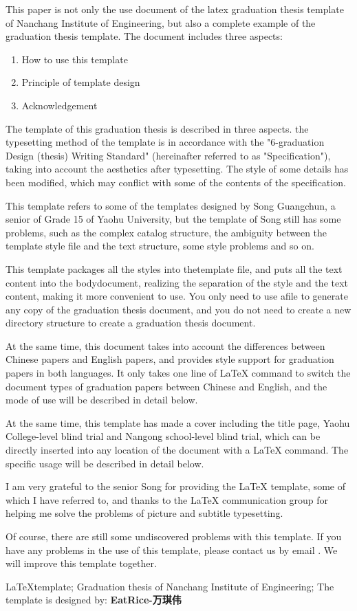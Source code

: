 \begin{Abstract}

    This paper is not only the use document of the latex graduation thesis template of Nanchang Institute of Engineering, but also a complete example of the graduation thesis template. 
    The document includes three aspects:

    \begin{enumerate}
        \item How to use this template
        \item Principle of template design
        \item Acknowledgement
    \end{enumerate}

    The template of this graduation thesis is described in three aspects. the typesetting method of the template is in accordance with the "6-graduation Design (thesis) Writing Standard" (hereinafter referred to as "Specification"), taking into account the aesthetics after typesetting. The style of some details has been modified, which may conflict with some of the contents of the specification.

    This template refers to some of the templates designed by Song Guangchun, a senior of Grade 15 of Yaohu University, but the template of Song still has some problems, such as the complex catalog structure, the ambiguity between the template style file and the text structure, some style problems and so on. 

    This template packages all the styles into thetemplate file, and puts all the text content into the bodydocument, realizing the separation of the style and the text content, making it more convenient to use. You only need to use afile to generate any copy of the graduation thesis document, and you do not need to create a new directory structure to create a graduation thesis document. 

    At the same time, this document takes into account the differences between Chinese papers and English papers, and provides style support for graduation papers in both languages. It only takes one line of \LaTeX{} command to switch the document types of graduation papers between Chinese and English, and the mode of use will be described in detail below.

    At the same time, this template has made a cover including the title page, Yaohu College-level blind trial and Nangong school-level blind trial, which can be directly inserted into any location of the document with a \LaTeX{} command. The specific usage will be described in detail below.

    I am very grateful to the senior Song for providing the \LaTeX{} template, some of which I have referred to, and thanks to the \LaTeX{} communication group for helping me solve the problems of picture and subtitle typesetting.

    Of course, there are still some undiscovered problems with this template. If you have any problems in the use of this template, please contact us by email . We will improve this template together.

\end{Abstract}
\begin{KeyWords}
    \LaTeX template; 
    Graduation thesis of Nanchang Institute of Engineering; 
    The template is designed by: \textbf{EatRice-万琪伟}
\end{KeyWords}